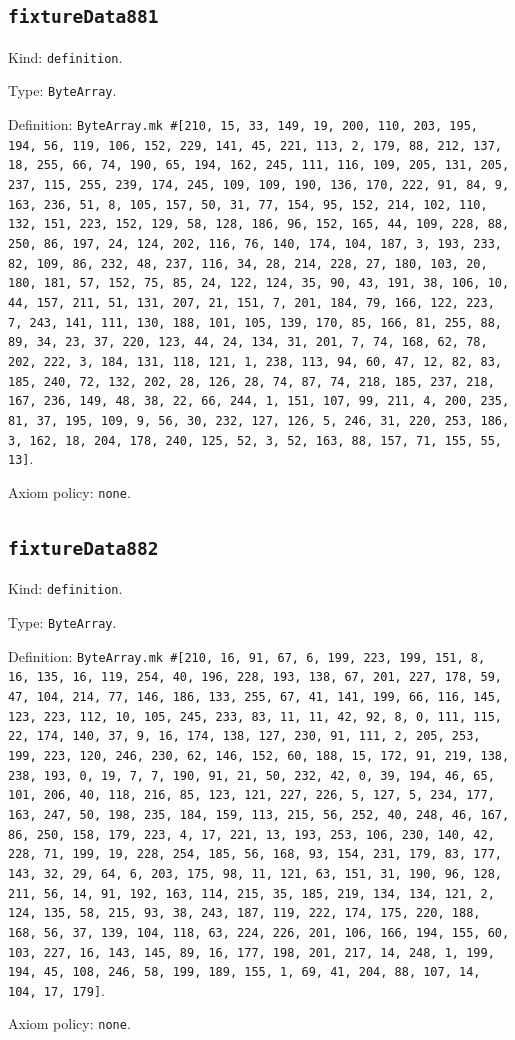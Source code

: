 \documentclass[11pt]{article}
\begin{document}
\subsection*{\texttt{fixtureData881}}
\noindent Kind: \texttt{definition}.\par
\noindent Type: \texttt{ByteArray}.\par
\noindent Definition: \texttt{ByteArray.mk \#[210, 15, 33, 149, 19, 200, 110, 203, 195, 194, 56, 119, 106, 152, 229, 141, 45, 221, 113, 2, 179, 88, 212, 137, 18, 255, 66, 74, 190, 65, 194, 162, 245, 111, 116, 109, 205, 131, 205, 237, 115, 255, 239, 174, 245, 109, 109, 190, 136, 170, 222, 91, 84, 9, 163, 236, 51, 8, 105, 157, 50, 31, 77, 154, 95, 152, 214, 102, 110, 132, 151, 223, 152, 129, 58, 128, 186, 96, 152, 165, 44, 109, 228, 88, 250, 86, 197, 24, 124, 202, 116, 76, 140, 174, 104, 187, 3, 193, 233, 82, 109, 86, 232, 48, 237, 116, 34, 28, 214, 228, 27, 180, 103, 20, 180, 181, 57, 152, 75, 85, 24, 122, 124, 35, 90, 43, 191, 38, 106, 10, 44, 157, 211, 51, 131, 207, 21, 151, 7, 201, 184, 79, 166, 122, 223, 7, 243, 141, 111, 130, 188, 101, 105, 139, 170, 85, 166, 81, 255, 88, 89, 34, 23, 37, 220, 123, 44, 24, 134, 31, 201, 7, 74, 168, 62, 78, 202, 222, 3, 184, 131, 118, 121, 1, 238, 113, 94, 60, 47, 12, 82, 83, 185, 240, 72, 132, 202, 28, 126, 28, 74, 87, 74, 218, 185, 237, 218, 167, 236, 149, 48, 38, 22, 66, 244, 1, 151, 107, 99, 211, 4, 200, 235, 81, 37, 195, 109, 9, 56, 30, 232, 127, 126, 5, 246, 31, 220, 253, 186, 3, 162, 18, 204, 178, 240, 125, 52, 3, 52, 163, 88, 157, 71, 155, 55, 13]}.\par
\noindent Axiom policy: \texttt{none}.\par
\subsection*{\texttt{fixtureData882}}
\noindent Kind: \texttt{definition}.\par
\noindent Type: \texttt{ByteArray}.\par
\noindent Definition: \texttt{ByteArray.mk \#[210, 16, 91, 67, 6, 199, 223, 199, 151, 8, 16, 135, 16, 119, 254, 40, 196, 228, 193, 138, 67, 201, 227, 178, 59, 47, 104, 214, 77, 146, 186, 133, 255, 67, 41, 141, 199, 66, 116, 145, 123, 223, 112, 10, 105, 245, 233, 83, 11, 11, 42, 92, 8, 0, 111, 115, 22, 174, 140, 37, 9, 16, 174, 138, 127, 230, 91, 111, 2, 205, 253, 199, 223, 120, 246, 230, 62, 146, 152, 60, 188, 15, 172, 91, 219, 138, 238, 193, 0, 19, 7, 7, 190, 91, 21, 50, 232, 42, 0, 39, 194, 46, 65, 101, 206, 40, 118, 216, 85, 123, 121, 227, 226, 5, 127, 5, 234, 177, 163, 247, 50, 198, 235, 184, 159, 113, 215, 56, 252, 40, 248, 46, 167, 86, 250, 158, 179, 223, 4, 17, 221, 13, 193, 253, 106, 230, 140, 42, 228, 71, 199, 19, 228, 254, 185, 56, 168, 93, 154, 231, 179, 83, 177, 143, 32, 29, 64, 6, 203, 175, 98, 11, 121, 63, 151, 31, 190, 96, 128, 211, 56, 14, 91, 192, 163, 114, 215, 35, 185, 219, 134, 134, 121, 2, 124, 135, 58, 215, 93, 38, 243, 187, 119, 222, 174, 175, 220, 188, 168, 56, 37, 139, 104, 118, 63, 224, 226, 201, 106, 166, 194, 155, 60, 103, 227, 16, 143, 145, 89, 16, 177, 198, 201, 217, 14, 248, 1, 199, 194, 45, 108, 246, 58, 199, 189, 155, 1, 69, 41, 204, 88, 107, 14, 104, 17, 179]}.\par
\noindent Axiom policy: \texttt{none}.\par
\end{document}
